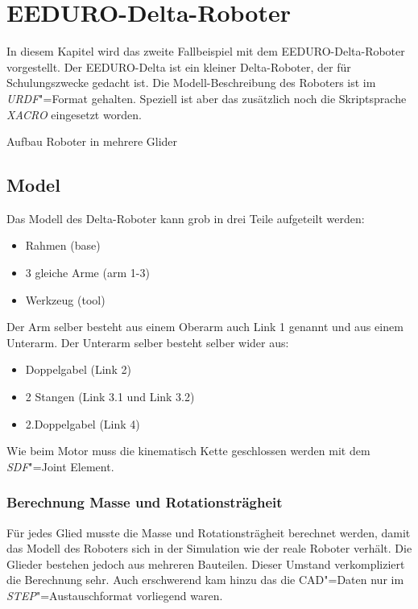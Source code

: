 \chapter{EEDURO-Delta-Roboter}


In diesem Kapitel wird das zweite Fallbeispiel mit dem EEDURO-Delta-Roboter vorgestellt.
Der EEDURO-Delta ist ein kleiner Delta-Roboter, der für Schulungszwecke gedacht ist.
Die Modell-Beschreibung des Roboters ist im \textit{URDF}"=Format gehalten.
Speziell ist aber das zusätzlich noch die Skriptsprache \textit{XACRO} eingesetzt worden. %


Aufbau Roboter in mehrere Glider

\section{Model}
Das Modell des Delta-Roboter kann grob in drei Teile aufgeteilt werden:
\begin{itemize}
\item Rahmen (base)
\item 3 gleiche Arme (arm 1-3)
\item Werkzeug (tool)
\end{itemize}

Der Arm selber besteht aus einem Oberarm auch Link 1 genannt und aus einem Unterarm.
Der Unterarm selber besteht selber wider aus:
\begin{itemize}
\item Doppelgabel (Link 2)
\item 2 Stangen (Link 3.1 und Link 3.2)
\item 2.Doppelgabel (Link 4)
\end{itemize}

Wie beim Motor muss die kinematisch Kette geschlossen werden mit dem \textit{SDF}"=Joint Element.


\subsection{Berechnung Masse und Rotationsträgheit}
Für jedes Glied musste die Masse und Rotationsträgheit berechnet werden, damit das Modell des Roboters sich in der Simulation wie der reale Roboter verhält.
Die Glieder bestehen jedoch aus mehreren Bauteilen.
Dieser Umstand verkompliziert die Berechnung sehr.
Auch erschwerend kam hinzu das die CAD"=Daten nur im \textit{STEP}"=Austauschformat vorliegend waren.

